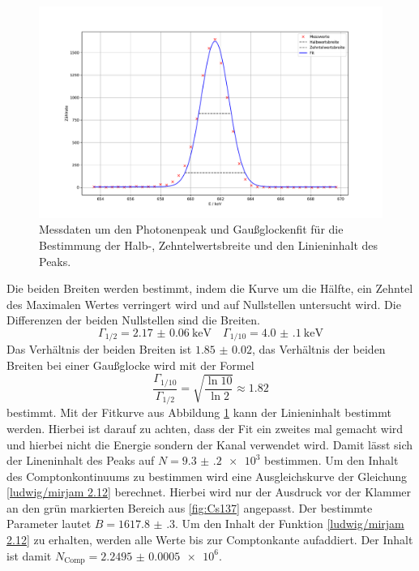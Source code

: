 \begin{figure}
  \centering
  \caption{Messdaten um den Photonenpeak und Gaußglockenfit für die Bestimmung der Halb-, Zehntelwertsbreite und den Linieninhalt des Peaks.}
  \label{fig:02_fit}
  \includegraphics[width=\textwidth,keepaspectratio]{figure/02_peak_fit.pdf}
\end{figure}
\FloatBarrier
Die beiden Breiten werden bestimmt, indem die Kurve um die Hälfte, ein Zehntel des Maximalen Wertes verringert wird und auf Nullstellen 
untersucht wird.
Die Differenzen der beiden Nullstellen sind die Breiten.
\begin{equation*}
  \Gamma_{1/2} = \SI{2.17(6)}{\kilo\eV}\quad \Gamma_{1/10} = \SI{4.0(1)}{\kilo\eV}
\end{equation*}
Das Verhältnis der beiden Breiten ist $\num{1.85(2)}$, das Verhältnis der beiden Breiten bei einer Gaußglocke wird 
mit der Formel
\begin{equation*}
  \frac{\Gamma_{1/10}}{\Gamma_{1/2}}= \sqrt{\frac{\ln{10}}{\ln{2}}} \approx \num{1.82}
\end{equation*}
bestimmt.
Mit der Fitkurve aus Abbildung \ref{fig:02_fit} kann der Linieninhalt bestimmt werden. Hierbei ist darauf zu achten, dass der Fit ein zweites mal gemacht wird 
und hierbei nicht die Energie sondern der Kanal verwendet wird. Damit lässt sich der Lineninhalt des Peaks auf $N=\num{9.3(2)e3}$ bestimmen.
Um den Inhalt des Comptonkontinuums zu bestimmen wird eine Ausgleichskurve der Gleichung \eqref{ludwig/mirjam 2.12} berechnet.
Hierbei wird nur der Ausdruck vor der Klammer an den grün markierten Bereich aus \ref{fig:Cs137} angepasst.
Der bestimmte Parameter lautet $B=\num{1617.8(3)}$. Um den Inhalt der Funktion \ref{ludwig/mirjam 2.12} zu erhalten,
werden alle Werte bis zur Comptonkante aufaddiert. Der Inhalt ist damit $N_{\text{Comp}} = \num{2.2495(5)e6}$.
